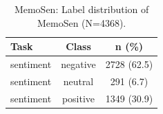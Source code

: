 \begin{table}[t]
\centering
\small
\caption{MemoSen: Label distribution of MemoSen (N=4368).}
\label{tab:data_memosen}
\begin{tabular}{lcc}
\toprule
Task & Class & n (\%) \\
\midrule
sentiment & negative & 2728 (62.5) \\
sentiment & neutral & 291 (6.7) \\
sentiment & positive & 1349 (30.9) \\
\bottomrule
\end{tabular}
\end{table}

